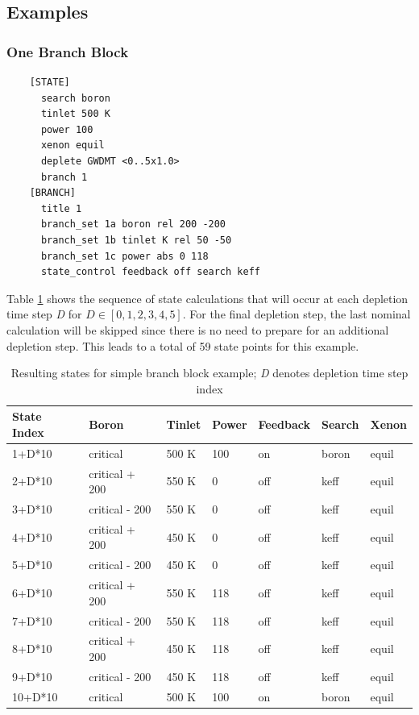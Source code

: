 \subsection{Examples}\label{sec:branch-examples}

\subsubsection{One Branch Block}

\begin{verbatim}
    [STATE]
      search boron
      tinlet 500 K
      power 100
      xenon equil
      deplete GWDMT <0..5x1.0>
      branch 1
    [BRANCH]
      title 1
      branch_set 1a boron rel 200 -200
      branch_set 1b tinlet K rel 50 -50
      branch_set 1c power abs 0 118
      state_control feedback off search keff
\end{verbatim}

Table \ref{tab:branch-example-simple} shows the sequence of state calculations that will occur at each depletion time step \emph{D} for $D \in [0, 1, 2, 3, 4, 5]$.  For the final depletion step, the last nominal calculation will be skipped since there is no need to prepare for an additional depletion step.  This leads to a total of 59 state points for this example.

\begin{table}[ht]
    \centering
    \caption{Resulting states for simple branch block example; \emph{D} denotes depletion time step index}\label{tab:branch-example-simple}
    \begin{tabular}{|l|l|l|l|l|l|l|}\hline
    \textbf{State Index} & \textbf{Boron} & \textbf{Tinlet} & \textbf{Power} & \textbf{Feedback} & \textbf{Search} & \textbf{Xenon} \\\hline
    1+D*10 & critical & 500 K & 100 & on & boron & equil \\\hline
    2+D*10 & critical + 200 & 550 K & 0 & off & keff & equil \\\hline
    3+D*10 & critical - 200 & 550 K & 0 & off & keff & equil \\\hline
    4+D*10 & critical + 200 & 450 K & 0 & off & keff & equil \\\hline
    5+D*10 & critical - 200 & 450 K & 0 & off & keff & equil \\\hline
    6+D*10 & critical + 200 & 550 K & 118 & off & keff & equil \\\hline
    7+D*10 & critical - 200 & 550 K & 118 & off & keff & equil \\\hline
    8+D*10 & critical + 200 & 450 K & 118 & off & keff & equil \\\hline
    9+D*10 & critical - 200 & 450 K & 118 & off & keff & equil \\\hline
    10+D*10 & critical & 500 K & 100 & on & boron & equil \\\hline
    \end{tabular}
\end{table}

